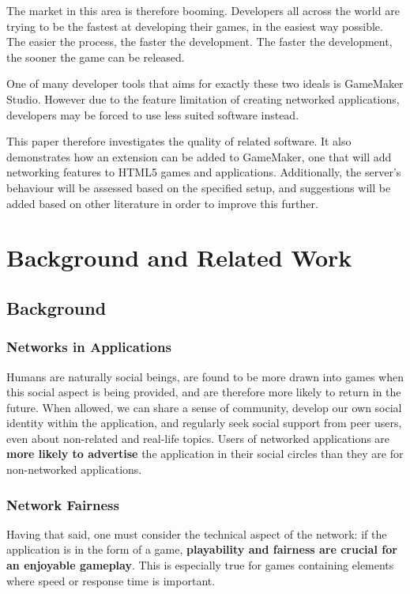 \documentclass[bsc,frontabs,twoside,singlespacing,parskip,deptreport]{infthesis}     %
\begin{document}
The market in this area is therefore booming. Developers all across the world are trying to be the fastest at developing their games, in the easiest way possible. The easier the process, the faster the development. The faster the development, the sooner the game can be released.

One of many developer tools that aims for exactly these two ideals is GameMaker Studio. However due to the feature limitation of creating networked applications, developers may be forced to use less suited software instead. 

This paper therefore investigates the quality of related software. It also demonstrates how an extension can be added to GameMaker, one that will add networking features to HTML5 games and applications. Additionally, the server's behaviour will be assessed based on the specified setup, and suggestions will be added based on other literature in order to improve this further.

\chapter{Background and Related Work}
\section{Background}
\subsection{Networks in Applications}
Humans are naturally social beings, are found to be more drawn into games when this social aspect is being provided, and are therefore more likely to return in the future\cite{Browser_Games}. When allowed, we can share a sense of community, develop our own social identity within the application, and regularly seek social support from peer users, even about non-related and real-life topics\cite{Community_Social_Psychology}. Users of networked applications are \textbf{more likely to advertise} the application in their social circles than they are for non-networked applications.

\subsection{Network Fairness}
Having that said, one must consider the technical aspect of the network: if the application is in the form of a game, \textbf{playability and fairness are crucial for an enjoyable gameplay}. This is especially true for games containing elements where speed or response time is important\cite{Fairness_and_Playability}.
\end{document}
